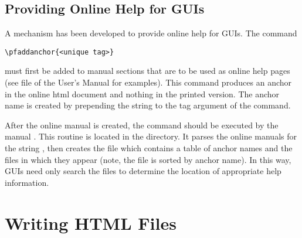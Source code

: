 
\subsection{Providing Online Help for GUIs}
\label{Providing Online Help for GUIs}

A mechanism has been developed to provide online help for \parflow{} GUIs.
The command
\begin{display}\begin{verbatim}
\pfaddanchor{<unique tag>}
\end{verbatim}\end{display}
must first be added to manual sections that are to be used as online help
pages (see file  of the User's Manual for examples).
This command produces an anchor in the online html document and
nothing in the printed version.
The anchor name is created by prepending the string 
to the tag argument of the  command.

After the online manual is created, the command 
should be executed by the manual .
This routine is located in the 
directory.
It parses the online manuals for the string ,
then creates the file  which contains a table of
anchor names and the files in which they appear (note, the file
is sorted by anchor name).
In this way, \parflow{} GUIs need only search the 
files to determine the location of appropriate help information.


\section{Writing HTML Files}
\label{Writing HTML Files}

